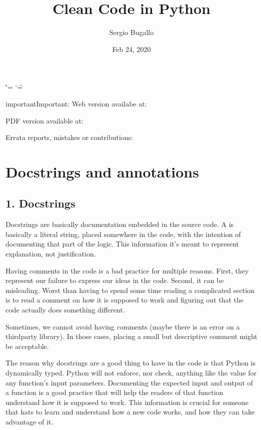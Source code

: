 \documentclass[a4paper,10pt,english]{sphinxmanual}
\title{Clean Code in Python}
\date{Feb 24, 2020}
\author{Sergio Bugallo}
\begin{document}
\ifdefined\shorthandoff
  \ifnum\catcode`\=\string=\active\shorthandoff{=}\fi
  \ifnum\catcode`\"=\active{}\fi
\fi

\pagestyle{empty}
\sphinxmaketitle
\pagestyle{plain}
\sphinxtableofcontents
\pagestyle{normal}
\label{\detokenize{index::doc}}


\begin{sphinxadmonition}{important}{Important:}
Web version availabe at: 

PDF version available at: 

Errata reports, mistakes or contributions: 
\end{sphinxadmonition}


\chapter{Docstrings and annotations}
\label{\detokenize{chapters/1_docstrings_and_annotations/index:docstrings-and-annotations}}\label{\detokenize{chapters/1_docstrings_and_annotations/index::doc}}

\section{1. Docstrings}
\label{\detokenize{chapters/1_docstrings_and_annotations/index:docstrings}}
Docstrings are basically documentation embedded in the source code. A  is basically a literal
string, placed somewhere in the code, with the intention of documenting that part of the logic. This
information it’s meant to represent explanation, not justification.

Having comments in the code is a bad practice for multiple reasons. First, they represent our failure to
express our ideas in the code. Second, it can be misleading. Worst than having to spend some time reading a
complicated section is to read a comment on how it is supposed to work and figuring out that the code
actually does something different.

Sometimes, we cannot avoid having comments (maybe there is an error on a third\sphinxhyphen{}party library). In those cases,
placing a small but descriptive comment might be acceptable.

The reason why docstrings are a good thing to have in the code is that Python is dynamically typed. Python
will not enforce, nor check, anything like the value for any function’s input parameters. Documenting the
expected input and output of a function is a good practice that will help the readers of that function
understand how it is supposed to work. This information is crucial for someone that hats to learn and
understand how a new code works, and how they can take advantage of it.
\end{document}
